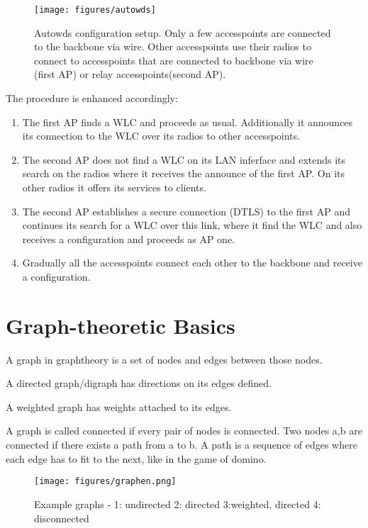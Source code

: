       \begin{figure}[h!]
	  \centering
	  \texttt{[image: figures/autowds]}
	  \caption{Autowds configuration setup. Only a few accesspoints are connected to the backbone via wire. 
	  Other accesspoints use their radios to connect to accesspoints that are connected to backbone via wire (first \ac{AP}) or relay accesspoints(second \ac{AP}).}
	  \label{fig:autowds}
      \end{figure}
      The procedure is enhanced accordingly:
      \begin{enumerate}
       \item The first \ac{AP} finds a WLC and proceeds as usual. Additionally it announces its connection to the WLC over its radios to other accesspoints.
       \item The second \ac{AP} does not find a \ac{WLC} on its LAN inferface and extends its search on the radios where it receives the announce of the first \ac{AP}.
	On its other radios it offers its services to clients.
       \item The second \ac{AP} establishes a secure connection (\ac{DTLS}) to the first \ac{AP} and continues its search for a \ac{WLC} over this link, 
	where it find the \ac{WLC} and also receives a configuration and proceeds as \ac{AP} one.
	\item Gradually all the accesspoints connect each other to the backbone and receive a configuration.
      \end{enumerate}

	
\section{Graph-theoretic Basics}
  A graph in graphtheory is a set of nodes and edges between those nodes. 
  
  A directed graph/digraph has directions on its edges defined.
  
  A weighted graph has weights attached to its edges.
  
  A graph is called connected if every pair of nodes is connected. 
  Two nodes a,b are connected if there exists a path from a to b.
  A path is a sequence of edges where each edge has to fit to the next, like in the game of domino.
  
  \begin{figure}[th!]
    \centering
    \texttt{[image: figures/graphen.png]}
    \caption{Example graphs - 1: undirected 2: directed 3:weighted, directed 4: disconnected}
    \label{fig:graphen}
  \end{figure}

